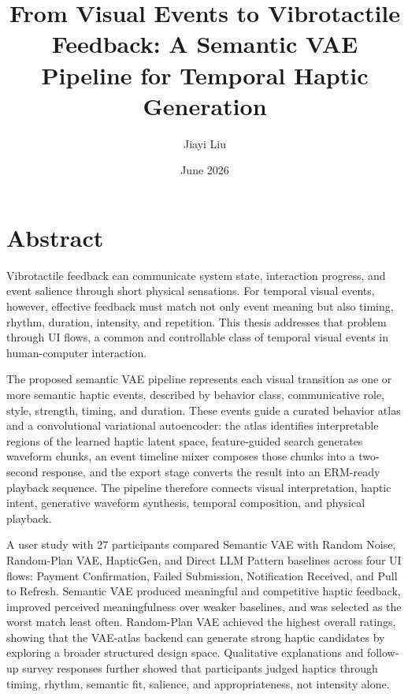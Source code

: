 \documentclass{dcthesis}
\title{From Visual Events to Vibrotactile Feedback: A Semantic VAE Pipeline for Temporal Haptic Generation}
\author{Jiayi Liu}
\date{June 2026}
\theoremstyle{definition}
\theoremstyle{remark}
\begin{document}
\frontmatter

\maketitle
\restoregeometry

\chapter*{Abstract}
{}
Vibrotactile feedback can communicate system state, interaction progress, and event salience through short physical sensations.
For temporal visual events, however, effective feedback must match not only event meaning but also timing, rhythm, duration, intensity, and repetition.
This thesis addresses that problem through UI flows, a common and controllable class of temporal visual events in human-computer interaction.

The proposed semantic VAE pipeline represents each visual transition as one or more semantic haptic events, described by behavior class, communicative role, style, strength, timing, and duration.
These events guide a curated behavior atlas and a convolutional variational autoencoder: the atlas identifies interpretable regions of the learned haptic latent space, feature-guided search generates waveform chunks, an event timeline mixer composes those chunks into a two-second response, and the export stage converts the result into an ERM-ready playback sequence.
The pipeline therefore connects visual interpretation, haptic intent, generative waveform synthesis, temporal composition, and physical playback.

A user study with 27 participants compared Semantic VAE with Random Noise, Random-Plan VAE, HapticGen, and Direct LLM Pattern baselines across four UI flows: Payment Confirmation, Failed Submission, Notification Received, and Pull to Refresh.
Semantic VAE produced meaningful and competitive haptic feedback, improved perceived meaningfulness over weaker baselines, and was selected as the worst match least often.
Random-Plan VAE achieved the highest overall ratings, showing that the VAE-atlas backend can generate strong haptic candidates by exploring a broader structured design space.
Qualitative explanations and follow-up survey responses further showed that participants judged haptics through timing, rhythm, semantic fit, salience, and appropriateness, not intensity alone.
\end{document}
